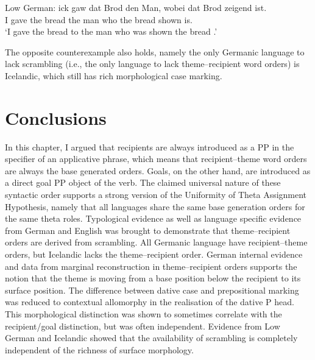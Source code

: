 \begin{exe}
	\ex Low German:
	\gll ick gaw dat Brod den Man, wobei dat Brod zeigend ist.\\
	I gave the bread the man who the bread shown is.\\
	\trans `I gave the bread to the man who was shown the bread \citep{Mussaus.1829}.'
\end{exe}

The opposite counterexample also holds, namely the only Germanic language to lack scrambling (i.e., the only language to lack theme--recipient word orders) is Icelandic, which still has rich morphological case marking.



\section{Conclusions}
	In this chapter, I argued that recipients are always introduced as a PP in the specifier of an applicative phrase, which means that recipient--theme word orders are always the base generated orders. Goals, on the other hand, are introduced as a direct goal PP object of the verb. The claimed universal nature of these syntactic order supports a strong version of the Uniformity of Theta Assignment Hypothesis, namely that all languages share the same base generation orders for the same theta roles.
	Typological evidence as well as language specific evidence from German and English was brought to demonstrate that theme--recipient orders are derived from scrambling. All Germanic language have recipient--theme orders, but Icelandic lacks the theme--recipient order. German internal evidence and data from marginal reconstruction in theme--recipient orders supports the notion that the theme is moving from a base position below the recipient to its surface position.
	The difference between dative case and prepositional marking was reduced to contextual allomorphy in the realisation of the dative P head. This morphological distinction was shown to sometimes correlate with the recipient/goal distinction, but was often independent. Evidence from Low German and Icelandic showed that the availability of scrambling is completely independent of the richness of surface morphology.

%

